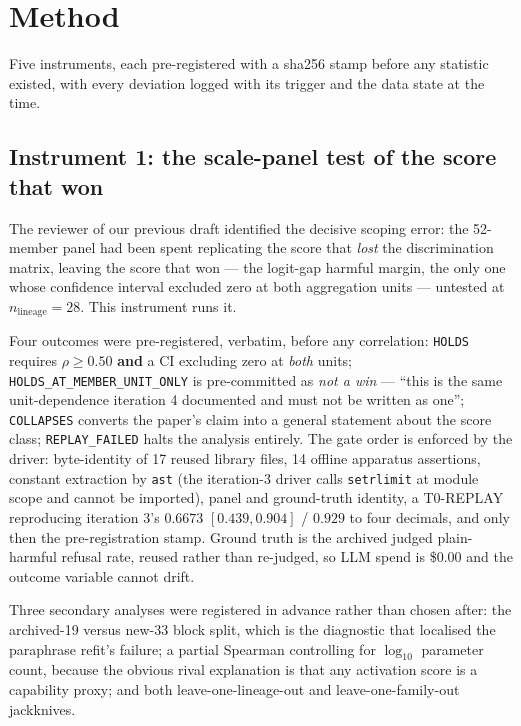 \documentclass[11pt,letterpaper]{article}
\begin{document}
\section{Method}
\label{sec:method}

Five instruments, each pre-registered with a sha256 stamp before any statistic existed, with every deviation logged with its trigger and the data state at the time.

\subsection{Instrument 1: the scale-panel test of the score that won}

The reviewer of our previous draft identified the decisive scoping error: the 52-member panel had been spent replicating the score that \emph{lost} the discrimination matrix, leaving the score that won --- the logit-gap harmful margin, the only one whose confidence interval excluded zero at both aggregation units --- untested at $n_{\text{lineage}} = 28$. This instrument runs it.

Four outcomes were pre-registered, verbatim, before any correlation: \texttt{HOLDS} requires $\rho \geq 0.50$ \textbf{and} a CI excluding zero at \emph{both} units; \texttt{HOLDS\_AT\_MEMBER\_UNIT\_ONLY} is pre-committed as \emph{not a win} --- ``this is the same unit-dependence iteration 4 documented and must not be written as one''; \texttt{COLLAPSES} converts the paper's claim into a general statement about the score class; \texttt{REPLAY\_FAILED} halts the analysis entirely. The gate order is enforced by the driver: byte-identity of 17 reused library files, 14 offline apparatus assertions, constant extraction by \texttt{ast} (the iteration-3 driver calls \texttt{setrlimit} at module scope and cannot be imported), panel and ground-truth identity, a T0-REPLAY reproducing iteration 3's $0.6673$ $[0.439, 0.904]$ / $0.929$ to four decimals, and only then the pre-registration stamp. Ground truth is the archived judged plain-harmful refusal rate, reused rather than re-judged, so LLM spend is \$0.00 and the outcome variable cannot drift.

Three secondary analyses were registered in advance rather than chosen after: the archived-19 versus new-33 block split, which is the diagnostic that localised the paraphrase refit's failure; a partial Spearman controlling for $\log_{10}$ parameter count, because the obvious rival explanation is that any activation score is a capability proxy; and both leave-one-lineage-out and leave-one-family-out jackknives.
\end{document}
